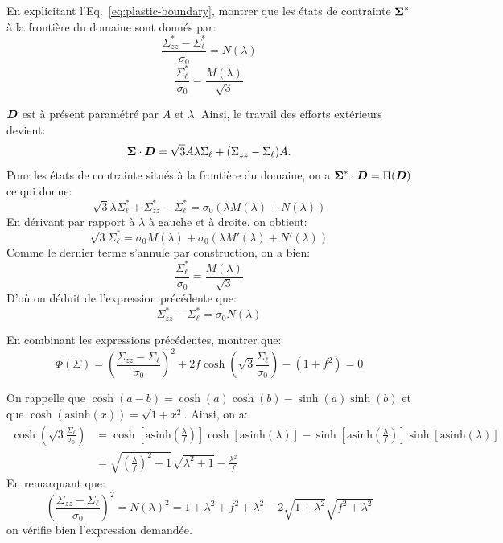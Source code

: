 \documentclass[french,english,12pt]{exam}
\begin{document}
\begin{questions}
\question En explicitant l'Eq.~\eqref{eq:plastic-boundary}, montrer que les états de contrainte $\boldsymbol{\Sigma}^*$ à la frontière du domaine sont donnés par:
  \begin{equation}
    \frac{\Sigma_{zz}^* - \Sigma_\ell^*}{\sigma_0} = N(\lambda)
\end{equation}  
    \begin{equation}
    \frac{\Sigma_\ell^*}{\sigma_0} = \frac{M(\lambda)}{\sqrt{3}}
\end{equation}  
\begin{solution}
$\boldsymbol{D}$ est à présent paramétré par $A$ et $\lambda$. Ainsi, le travail des efforts extérieurs devient:
$$\boldsymbol{\Sigma} \cdot \boldsymbol{D} = \sqrt{3}A\lambda\Sigma_\ell + (\Sigma_{zz}-\Sigma_\ell)A.$$
Pour les états de contrainte situés à la frontière du domaine, on a $\boldsymbol{\Sigma}^* \cdot \boldsymbol{D} = \Pi(\boldsymbol{D})$ ce qui donne:
$$  \sqrt{3}\lambda\Sigma_\ell^* + \Sigma_{zz}^*-\Sigma_\ell^* = \sigma_0 \left(\lambda M(\lambda)+N(\lambda)\right)$$
En dérivant par rapport à $\lambda$ à gauche et à droite, on obtient:
$$ \sqrt{3}\Sigma_\ell^* = \sigma_0 M(\lambda)+ \sigma_0(\lambda M'(\lambda)+N'(\lambda))$$
Comme le dernier terme s'annule par construction, on a bien:
$$\frac{\Sigma_\ell^*}{\sigma_0} = \frac{M(\lambda)}{\sqrt{3}}$$
D'où on déduit de l'expression précédente que:
$$\Sigma_{zz}^*-\Sigma_\ell^* = \sigma_0 N(\lambda)$$
\end{solution}
  
\question En combinant les expressions précédentes, montrer que:
  \begin{equation}
   \Phi\left( \Sigma     \right)  = \left(  \frac{\Sigma_{zz} - \Sigma_\ell}{\sigma_0} \right)^2 + 2f \cosh{\left(  \sqrt{3} \frac{\Sigma_\ell}{\sigma_0} \right)} - (1 + f^2) = 0
\label{eq4}
  \end{equation}  
\begin{solution}
On rappelle que $\cosh(a-b)=\cosh(a)\cosh(b)-\sinh(a)\sinh(b)$ et que $\cosh(\mathrm{asinh}(x)) = \sqrt{1+x^2}$. Ainsi, on a:
\begin{align*}
\cosh{\left(  \sqrt{3} \frac{\Sigma_\ell}{\sigma_0} \right)} &= \cosh{\left[\mathrm{asinh}{\left( \frac{\lambda}{f} \right)}\right]}\cosh[\mathrm{asinh}{(\lambda)}] - \sinh{\left[\mathrm{asinh}{\left( \frac{\lambda}{f} \right)}\right]}\sinh[\mathrm{asinh}{(\lambda)}]\\
&= \sqrt{\left(\frac{\lambda}{f} \right)^2+1}\sqrt{\lambda^2+1} - \frac{\lambda^2}{f}
\end{align*}
En remarquant que:
$$\left(  \frac{\Sigma_{zz} - \Sigma_\ell}{\sigma_0} \right)^2 = N(\lambda)^2 = 1+\lambda^2+f^2+\lambda^2 -2\sqrt{1+\lambda^2}\sqrt{f^2+\lambda^2}$$
on vérifie bien l'expression demandée.
\end{solution}



\end{questions}
\end{document}
